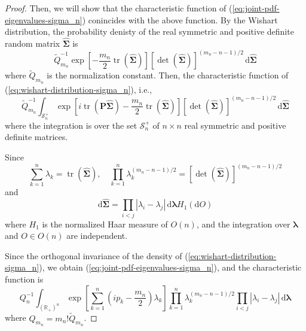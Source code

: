 \begin{proof}
    Then, we will show that the characteristic function of (\ref{eq:joint-pdf-eigenvalues-sigma_n}) conincides with the above function. By the Wishart distribution, the probability denisty of the real symmetric and positive definite random matrix $\widehat{\boldsymbol{\Sigma}}$ is
    \begin{equation}
        \widetilde{Q}_{m_{n}}^{-1}\exp\left[-\frac{m_{n}}{2}\operatorname{tr}\left(\widehat{\boldsymbol{\Sigma}}\right)\right]\left[\operatorname{det}\left(\widehat{\boldsymbol{\Sigma}}\right)\right]^{(m_{n}-n-1)/2}\,\mathrm{d}\widehat{\boldsymbol{\Sigma}}
        \label{eq:wishart-distribution-sigma_n}
    \end{equation}
    where $\widetilde{Q}_{m_{n}}$ is the normalization constant. Then, the characteristic function of (\ref{eq:wishart-distribution-sigma_n}), i.e.,
    \begin{equation*}
        \widetilde{Q}_{m_{n}}^{-1}\int_{\mathcal{S}_{n}^{+}}\exp\left[i\operatorname{tr}\left(\mathbf{P}\widehat{\boldsymbol{\Sigma}}\right)-\frac{m_{n}}{2}\operatorname{tr}\left(\widehat{\boldsymbol{\Sigma}}\right)\right]\left[\operatorname{det}\left(\widehat{\boldsymbol{\Sigma}}\right)\right]^{(m_{n}-n-1)/2}\,\mathrm{d}\widehat{\boldsymbol{\Sigma}}
    \end{equation*}
    where the integration is over the set $\mathcal{S}_{n}^{+}$ of $n\times n$ real symmetric and positive definite matrices.

    Since
    \begin{equation*}
        \sum_{k=1}^{n}\lambda_{k}=\operatorname{tr}\left(\widehat{\boldsymbol{\Sigma}}\right),\quad\prod_{k=1}^{n}\lambda_{k}^{(m_{n}-n-1)/2}=\left[\operatorname{det}\left(\widehat{\boldsymbol{\Sigma}}\right)\right]^{(m_{n}-n-1)/2}
    \end{equation*}
    and
    \begin{equation*}
        \mathrm{d}\widehat{\boldsymbol{\Sigma}}=\prod_{i<j}\left|\lambda_{i}-\lambda_{j}\right|\,\mathrm{d}\boldsymbol{\lambda}H_{1}\left(\mathrm{d}O\right)
    \end{equation*}
    where $H_{1}$ is the normalized Haar measure of $O(n)$, and the integration over $\boldsymbol{\lambda}$ and $O\in O(n)$ are independent.

    Since the orthogonal invariance of the density of (\ref{eq:wishart-distribution-sigma_n}), we obtain (\ref{eq:joint-pdf-eigenvalues-sigma_n}), and the characteristic function is
    \begin{equation}
        Q_{n}^{-1}\int_{\left(\mathbb{R}_{+}\right)^{n}}\exp\left[\sum_{k=1}^{n}\left(i p_{k}-\frac{m_{n}}{2}\right)\lambda_{k}\right]\prod_{k=1}^{n}\lambda_{k}^{(m_{n}-n-1)/2}\prod_{i<j}\left|\lambda_{i}-\lambda_{j}\right|\,\mathrm{d}\boldsymbol{\lambda}
        \label{eq:characteristic-function-wishart}
    \end{equation}
    where $Q_{m_{n}}=m_{n}!\widetilde{Q}_{m_{n}}$.


\end{proof}
